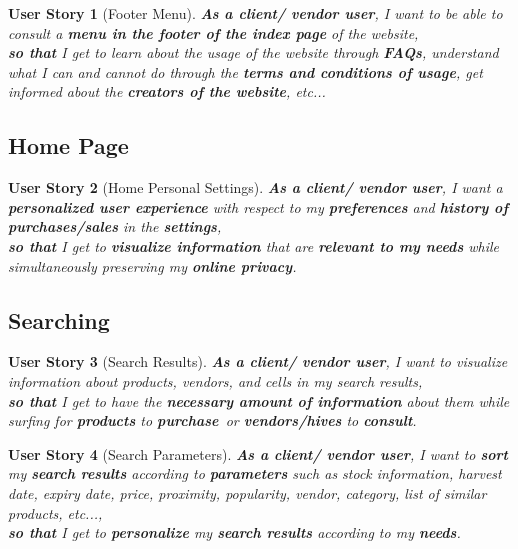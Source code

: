 \documentclass[a4paper,12pt]{book}
\theoremstyle{break}
\newtheorem{userStory}{User Story}
\theoremstyle{break}
\theoremstyle{definition}
\theoremstyle{remark}
\begin{document}
\begin{userStory}[Footer Menu]
\textbf{As a {\color{green} client}/{\color{red} vendor} user}, I want to be able to consult a \textbf{menu in the footer of the index page} of the website,\\
\indent
\textbf{so that} I get to learn about the usage of the website through \textbf{FAQs}, understand what I can and cannot do through the \textbf{terms and conditions of usage}, get informed about the \textbf{creators of the website}, \textit{etc...}
\end{userStory}

\subsection{Home Page}
\begin{userStory}[Home Personal Settings]
\textbf{As a {\color{green} client}/{\color{red} vendor} user}, I want a \textbf{personalized user experience} with respect to my \textbf{preferences} and \textbf{history of purchases/sales} in the \textbf{settings},\\
\indent
\textbf{so that} I get to \textbf{visualize information} that are \textbf{relevant to my needs} while simultaneously preserving my \textbf{online privacy}.
\end{userStory}

\subsection{Searching}
\begin{userStory}[Search Results]
\textbf{As a {\color{green} client}/{\color{red} vendor} user}, I want to visualize information about products, vendors, and cells in my search results,\\
\indent
\textbf{so that} I get to have the \textbf{necessary amount of information} about them while surfing for \textbf{products} to \textbf{purchase} or \textbf{vendors/hives} to \textbf{consult}.
\end{userStory}

\begin{userStory}[Search Parameters]
\textbf{As a {\color{green} client}/{\color{red} vendor} user}, I want to \textbf{sort} my \textbf{search results} according to \textbf{parameters} such as stock information, harvest date, expiry date, price, proximity, popularity, vendor, category, list of similar products, etc...,\\
\indent
\textbf{so that} I get to \textbf{personalize} my \textbf{search results} according to my \textbf{needs}.
\end{userStory}
\end{document}
